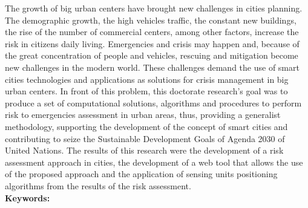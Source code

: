 \begin{thesisabastract}

The growth of big urban centers have brought new challenges in cities planning. The demographic growth, the high vehicles traffic, the constant new buildings, the rise of the number of commercial centers, among other factors, increase the risk in citizens daily living. Emergencies and crisis may happen and, because of the great concentration of people and vehicles, rescuing and mitigation become new challenges in the modern world. These challenges demand the use of smart cities technologies and applications as solutions for crisis management in big urban centers. In front of this problem, this doctorate research's goal was to produce a set of computational solutions, algorithms and procedures to perform risk to emergencies assessment in urban areas, thus, providing a generalist methodology, supporting the development of the concept of smart cities and contributing to seize the Sustainable Development Goals of Agenda 2030 of United Nations. The results of this research were the development of a risk assessment approach in cities, the development of a web tool that allows the use of the proposed approach and the application of sensing units positioning algorithms from the results of the risk assessment.\\

\textbf{Keywords:} \ppgmkeywords

\end{thesisabastract}
